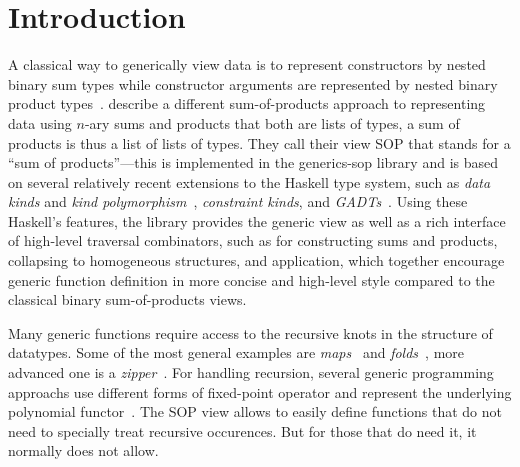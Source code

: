 \documentclass[sigplan,review,anonymous]{acmart}\settopmatter{printfolios=true,printccs=false,printacmref=false}
\begin{document}
\maketitle


\section{Introduction}

A classical way to generically view data is to represent constructors by nested binary sum types while constructor arguments are represented by nested binary product types~\citep{VanNoort2008, MuRec2009, Cheney2002, Magalhaes2010, Loeh2004}\nocite{Rodriguez2008}\nocite{Magalhaes2012}. \citet{VriLoeh2014} describe a different sum-of-products approach to representing data using $n$-ary sums and products that both are lists of types, a sum of products is thus a list of lists of types. They call their view SOP that stands for a ``sum of products''---this is implemented in the \textsf{generics-sop} library and is based on several relatively recent extensions to the Haskell type system, such as \emph{data kinds} and \emph{kind polymorphism}~\citep{Yorgey2012}, \emph{constraint kinds}, and \emph{GADTs}~\cite{Schrijvers2009}. Using these Haskell's features, the library provides the generic view as well as a rich interface of high-level traversal combinators, such as for constructing sums and products, collapsing to homogeneous structures, and application, which together encourage generic function definition in more concise and high-level style compared to the classical binary sum-of-products views.

Many generic functions require access to the recursive knots in the structure of datatypes. Some of the most general examples are \emph{maps}~\citep{Magalhaes2010} and \emph{folds}~\citep{Meijer1991, MuRec2009}, more advanced one is a \emph{zipper}~\citep{Huet1997, MuRec2009, HiJeLo2004, Adams2010}. For handling recursion, several generic programming approachs use different forms of fixed-point operator and represent the underlying polynomial functor~\citep{VanNoort2008, MuRec2009, Jansson1997, Loeh2011}\nocite{MagLoeh2012}. The SOP view allows to easily define functions that do not need to specially treat recursive occurences. But for those that do need it, it normally does not allow.
\end{document}
